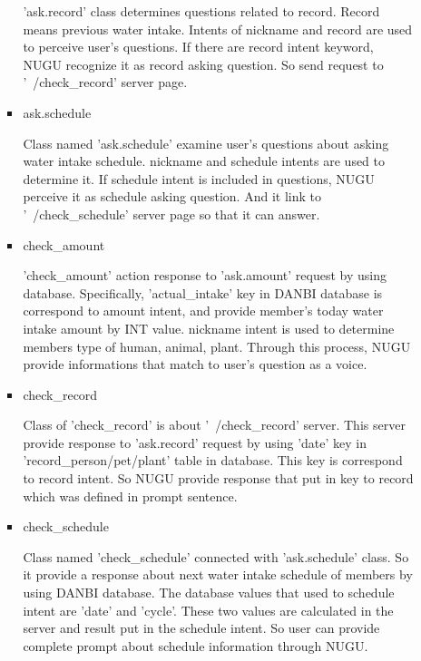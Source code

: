 \documentclass[conference]{IEEEtran}
\begin{document}
\begin{itemize}
\begin{enumerate}
\begin{itemize}
            'ask.record' class determines questions related to record. Record means previous water intake. Intents of {{nickname}} and {{record}} are used to perceive user's questions. If there are {{record}} intent keyword, NUGU recognize it as record asking question. So send request to '~/check\_record' server page.
            \item ask.schedule 
            \setlength{\parindent}{2ex}
            
            Class named 'ask.schedule' examine user's questions about asking water intake schedule. {{nickname}} and {{schedule}} intents are used to determine it. If {{schedule}} intent is included in questions, NUGU perceive it as schedule asking question. And it link to '~/check\_schedule' server page so that it can answer.
            \item check\_amount 
            \setlength{\parindent}{2ex}
            
            'check\_amount' action response to 'ask.amount' request by using database. Specifically, 'actual\_intake' key in DANBI database is correspond to {{amount}} intent, and provide member's today water intake amount by INT value. {{nickname}} intent is used to determine members type of human, animal, plant. Through this process, NUGU provide informations that match to user's question as a voice.
            \item check\_record 
            \setlength{\parindent}{2ex}
            
            Class of 'check\_record' is about '~/check\_record' server. This server provide response to 'ask.record' request by using 'date' key in 'record\_person/pet/plant' table in database. This key is correspond to {{record}} intent. So NUGU provide response that put in key to {{record}} which was defined in prompt sentence.
            \item check\_schedule 
            \setlength{\parindent}{2ex}
            
            Class named 'check\_schedule' connected with 'ask.schedule' class. So it provide a response about next water intake schedule of members by using DANBI database. The database values that used to {{schedule}} intent are 'date' and 'cycle'. These two values are calculated in the server and result put in the {{schedule}} intent. So user can provide complete prompt about schedule information through NUGU.
            
        \end{itemize}
        

\end{enumerate}
\end{itemize}
\end{document}
